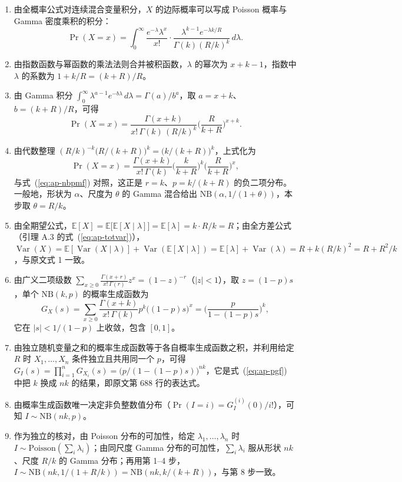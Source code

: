 \begin{enumerate}
\item 由全概率公式对连续混合变量积分，$X$ 的边际概率可以写成 Poisson 概率与 Gamma 密度乘积的积分：
\begin{equation*}
\Pr(X=x)=\int_0^\infty\frac{e^{-\lambda}\lambda^{x}}{x!}\cdot\frac{\lambda^{k-1}e^{-\lambda k/R}}{\Gamma(k)(R/k)^{k}}\,d\lambda .
\end{equation*}
\item 由指数函数与幂函数的乘法法则合并被积函数，$\lambda$ 的幂次为 $x+k-1$，指数中 $\lambda$ 的系数为 $1+k/R=(k+R)/R$。
\item 由 Gamma 积分 $\int_0^\infty\lambda^{a-1}e^{-b\lambda}\,d\lambda=\Gamma(a)/b^{a}$，取 $a=x+k$、$b=(k+R)/R$，可得
\begin{equation*}
\Pr(X=x)=\frac{\Gamma(x+k)}{x!\,\Gamma(k)\,(R/k)^{k}}\Big(\frac{R}{k+R}\Big)^{x+k}.
\end{equation*}
\item 由代数整理 $(R/k)^{-k}\big(R/(k+R)\big)^{k}=\big(k/(k+R)\big)^{k}$，上式化为
\begin{equation*}
\Pr(X=x)=\frac{\Gamma(x+k)}{x!\,\Gamma(k)}\Big(\frac{k}{k+R}\Big)^{k}\Big(\frac{R}{k+R}\Big)^{x},
\end{equation*}
与式~(\ref{eq:ap-nbpmf}) 对照，这正是 $r=k$、$p=k/(k+R)$ 的负二项分布。一般地，形状为 $\alpha$、尺度为 $\theta$ 的 Gamma 混合给出 $\mathrm{NB}(\alpha,1/(1+\theta))$，本步取 $\theta=R/k$。
\item 由全期望公式，$\mathbb{E}[X]=\mathbb{E}\big[\mathbb{E}[X\mid\lambda]\big]=\mathbb{E}[\lambda]=k\cdot R/k=R$；由全方差公式（引理 A.3 的式~(\ref{eq:ap-totvar})），$\operatorname{Var}(X)=\mathbb{E}[\operatorname{Var}(X\mid\lambda)]+\operatorname{Var}(\mathbb{E}[X\mid\lambda])=\mathbb{E}[\lambda]+\operatorname{Var}(\lambda)=R+k(R/k)^2=R+R^2/k$，与原文式 1 一致。
\item 由广义二项级数 $\sum_{x\ge0}\frac{\Gamma(x+r)}{x!\,\Gamma(r)}z^{x}=(1-z)^{-r}$（$|z|<1$），取 $z=(1-p)s$，单个 $\mathrm{NB}(k,p)$ 的概率生成函数为
\begin{equation}\label{eq:ap-pgf}
G_X(s)=\sum_{x\ge0}\frac{\Gamma(x+k)}{x!\,\Gamma(k)}p^{k}\big((1-p)s\big)^{x}=\Big(\frac{p}{1-(1-p)s}\Big)^{k},
\end{equation}
它在 $|s|<1/(1-p)$ 上收敛，包含 $[0,1]$。
\item 由独立随机变量之和的概率生成函数等于各自概率生成函数之积，并利用给定 $R$ 时 $X_1,\dots,X_n$ 条件独立且共用同一个 $p$，可得 $G_I(s)=\prod_{i=1}^nG_{X_i}(s)=\big(p/(1-(1-p)s)\big)^{nk}$，它是式~(\ref{eq:ap-pgf}) 中把 $k$ 换成 $nk$ 的结果，即原文第 688 行的表达式。
\item 由概率生成函数唯一决定非负整数值分布（$\Pr(I=i)=G_I^{(i)}(0)/i!$），可知 $I\sim\mathrm{NB}(nk,p)$。
\item 作为独立的核对，由 Poisson 分布的可加性，给定 $\lambda_1,\dots,\lambda_n$ 时 $I\sim\mathrm{Poisson}(\sum_i\lambda_i)$；由同尺度 Gamma 分布的可加性，$\sum_i\lambda_i$ 服从形状 $nk$、尺度 $R/k$ 的 Gamma 分布；再用第 1--4 步，$I\sim\mathrm{NB}(nk,1/(1+R/k))=\mathrm{NB}(nk,k/(k+R))$，与第 8 步一致。
\end{enumerate}

